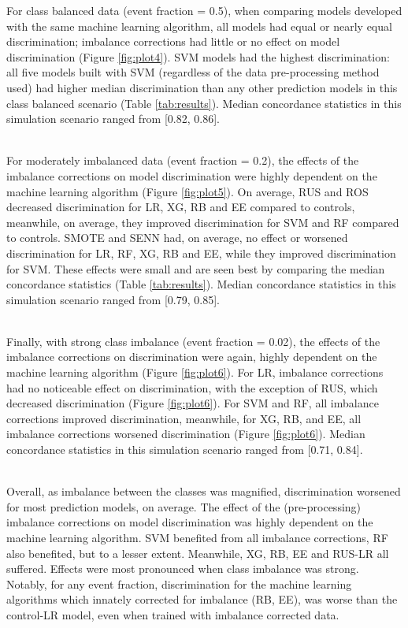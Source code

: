 \documentclass[AMA,STIX1COL,]{WileyNJD-v2}
\begin{document}
\hfill\break
For class balanced data (event fraction = 0.5), when comparing models
developed with the same machine learning algorithm, all models had equal
or nearly equal discrimination; imbalance corrections had little or no
effect on model discrimination (Figure \ref{fig:plot4}). SVM models had
the highest discrimination: all five models built with SVM (regardless
of the data pre-processing method used) had higher median discrimination
than any other prediction models in this class balanced scenario (Table
\ref{tab:results}). Median concordance statistics in this simulation
scenario ranged from {[}0.82, 0.86{]}.\\
\strut \\
For moderately imbalanced data (event fraction = 0.2), the effects of
the imbalance corrections on model discrimination were highly dependent
on the machine learning algorithm (Figure \ref{fig:plot5}). On average,
RUS and ROS decreased discrimination for LR, XG, RB and EE compared to
controls, meanwhile, on average, they improved discrimination for SVM
and RF compared to controls. SMOTE and SENN had, on average, no effect
or worsened discrimination for LR, RF, XG, RB and EE, while they
improved discrimination for SVM. These effects were small and are seen
best by comparing the median concordance statistics (Table
\ref{tab:results}). Median concordance statistics in this simulation
scenario ranged from {[}0.79, 0.85{]}.\\
\strut \\
Finally, with strong class imbalance (event fraction = 0.02), the
effects of the imbalance corrections on discrimination were again,
highly dependent on the machine learning algorithm (Figure
\ref{fig:plot6}). For LR, imbalance corrections had no noticeable effect
on discrimination, with the exception of RUS, which decreased
discrimination (Figure \ref{fig:plot6}). For SVM and RF, all imbalance
corrections improved discrimination, meanwhile, for XG, RB, and EE, all
imbalance corrections worsened discrimination (Figure \ref{fig:plot6}).
Median concordance statistics in this simulation scenario ranged from
{[}0.71, 0.84{]}.\\
\strut \\
Overall, as imbalance between the classes was magnified, discrimination
worsened for most prediction models, on average. The effect of the
(pre-processing) imbalance corrections on model discrimination was
highly dependent on the machine learning algorithm. SVM benefited from
all imbalance corrections, RF also benefited, but to a lesser extent.
Meanwhile, XG, RB, EE and RUS-LR all suffered. Effects were most
pronounced when class imbalance was strong. Notably, for any event
fraction, discrimination for the machine learning algorithms which
innately corrected for imbalance (RB, EE), was worse than the control-LR
model, even when trained with imbalance corrected data.
\end{document}
